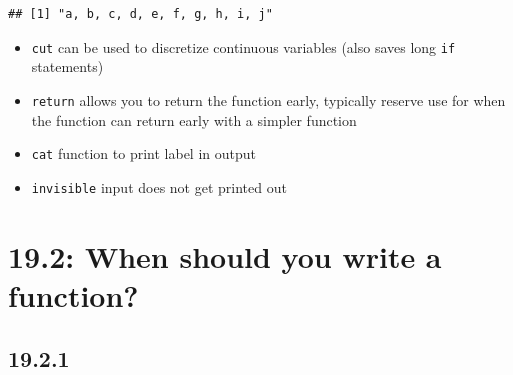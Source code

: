 \documentclass[]{book}
\providecommand{\tightlist}{%
  \setlength{\itemsep}{0pt}\setlength{\parskip}{0pt}}
\theoremstyle{definition}
\theoremstyle{definition}
\theoremstyle{definition}
\theoremstyle{remark}
\begin{document}
\begin{verbatim}
## [1] "a, b, c, d, e, f, g, h, i, j"
\end{verbatim}

\begin{itemize}
\tightlist
\item
  \texttt{cut} can be used to discretize continuous variables (also
  saves long \texttt{if} statements)
\item
  \texttt{return} allows you to return the function early, typically
  reserve use for when the function can return early with a simpler
  function
\item
  \texttt{cat} function to print label in output
\item
  \texttt{invisible} input does not get printed out
\end{itemize}

\hypertarget{when-should-you-write-a-function}{%
\section{19.2: When should you write a
function?}\label{when-should-you-write-a-function}}

\hypertarget{section-62}{%
\subsection{19.2.1}\label{section-62}}
\end{document}
